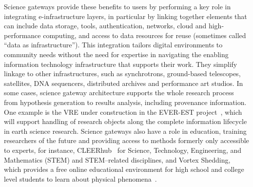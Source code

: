 \documentclass[review]{elsarticle}
\begin{document}
Science gateways provide these benefits to users by performing a key role in integrating e-infrastructure layers, in particular by linking together elements that can include data storage, tools, authentication, networks, cloud and high-performance computing, and access to data resources for reuse (sometimes called ``data as infrastructure''). This integration tailors digital environments to community needs without the need for expertise in navigating the enabling information technology infrastructure that supports their work. They simplify linkage to other infrastructures, such as synchrotrons, ground-based telescopes, satellites, DNA sequencers, distributed archives and performance art studios. In some cases, science gateway architecture supports the whole research process from hypothesis generation to results analysis, including provenance information. One example is the VRE under construction in the EVER-EST project~\cite{everest-73}, which will support handling of research objects along the complete information lifecycle in earth science research. 
Science gateways also have a role in education, training researchers of the future and providing access to methods formerly only accessible to experts, for instance, CLEERhub~\cite{cleerhub-74} for Science, Technology, Engineering, and Mathematics (STEM) and STEM–related disciplines, and Vortex Shedding, which provides a free online educational environment for high school and college level students to learn about physical phenomena~\cite{vortex-75}.
\end{document}
